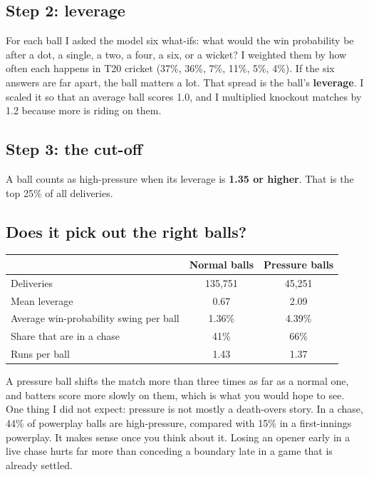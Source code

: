 \documentclass[10.5pt,a4paper]{article}
\begin{document}
\subsection{Step 2: leverage}

For each ball I asked the model six what-ifs: what would the win probability be after a dot, a single, a two, a four, a six, or a wicket? I weighted them by how often each happens in T20 cricket (37\%, 36\%, 7\%, 11\%, 5\%, 4\%). If the six answers are far apart, the ball matters a lot. That spread is the ball's \textbf{leverage}. I scaled it so that an average ball scores 1.0, and I multiplied knockout matches by 1.2 because more is riding on them.

\subsection{Step 3: the cut-off}

A ball counts as high-pressure when its leverage is \textbf{1.35 or higher}. That is the top 25\% of all deliveries.

\subsection{Does it pick out the right balls?}

\begin{table}[H]\centering\small
\begin{tabular}{l c c}
\toprule
 & Normal balls & Pressure balls\\
\midrule
Deliveries & 135,751 & 45,251\\
Mean leverage & 0.67 & 2.09\\
Average win-probability swing per ball & 1.36\% & 4.39\%\\
Share that are in a chase & 41\% & 66\%\\
Runs per ball & 1.43 & 1.37\\
\bottomrule
\end{tabular}
\end{table}

A pressure ball shifts the match more than three times as far as a normal one, and batters score more slowly on them, which is what you would hope to see. One thing I did not expect: pressure is not mostly a death-overs story. In a chase, 44\% of powerplay balls are high-pressure, compared with 15\% in a first-innings powerplay. It makes sense once you think about it. Losing an opener early in a live chase hurts far more than conceding a boundary late in a game that is already settled.
\end{document}
